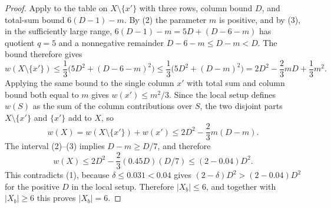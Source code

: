\begin{proof}
Apply  to the table on $X\setminus\{x'\}$ with
three rows, column bound $D$, and total-sum bound $6(D-1)-m$.  By (2) the
parameter $m$ is positive, and by (3), in the sufficiently large range,
$6(D-1)-m=5D+(D-6-m)$ has quotient $q=5$ and a nonnegative remainder
$D-6-m\le D-m<D$.  The bound therefore gives
\[
w(X\setminus\{x'\})\le
 \frac13\bigl(5D^2+(D-6-m)^2\bigr)
\le \frac13\bigl(5D^2+(D-m)^2\bigr)
=2D^2-\frac23mD+\frac13m^2 .
\]
Applying the same bound to the single column $x'$ with total sum and column
bound both equal to $m$ gives $w(x')\le m^2/3$.  Since the local setup defines
$w(S)$ as the sum of the column contributions over $S$, the two disjoint
parts $X\setminus\{x'\}$ and $\{x'\}$ add to $X$, so
\[
w(X)=w(X\setminus\{x'\})+w(x')
\le2D^2-\frac23m(D-m).
\]
The interval (2)--(3) implies $D-m\ge D/7$, and therefore
\[
w(X)\le 2D^2-\frac23(0.45D)(D/7)
\le(2-0.04)D^2.
\]
This contradicts (1), because $\delta\le0.031<0.04$ gives
$(2-\delta)D^2>(2-0.04)D^2$ for the positive $D$ in the local setup.
Therefore $|X_b|\le6$, and together with $|X_b|\ge6$ this proves
$|X_b|=6$.
\end{proof}

